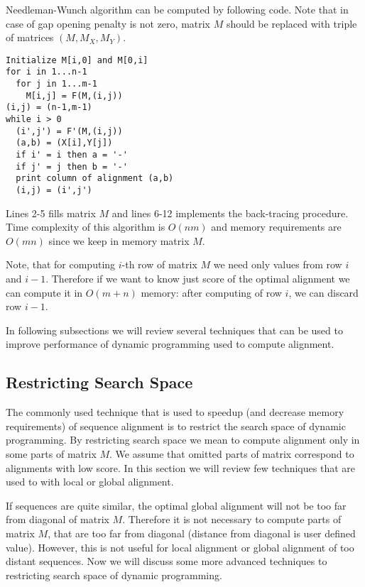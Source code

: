 Needleman-Wunch algorithm can be computed by following code. Note that in case
of gap opening penalty is not zero, matrix $M$ should be replaced with triple of
matrices $(M,M_X,M_Y)$. 

\lstset{showstringspaces=false}
\begin{lstlisting}
Initialize M[i,0] and M[0,i]
for i in 1...n-1
  for j in 1...m-1
    M[i,j] = F(M,(i,j))
(i,j) = (n-1,m-1)
while i > 0
  (i',j') = F'(M,(i,j))
  (a,b) = (X[i],Y[j])
  if i' = i then a = '-'
  if j' = j then b = '-'
  print column of alignment (a,b)
  (i,j) = (i',j')
\end{lstlisting}

Lines 2-5 fills matrix $M$ and lines 6-12 implements the back-tracing procedure.
Time complexity of this algorithm is $O(nm)$ and memory requirements are $O(mn)$
since we keep in memory matrix $M$.

Note, that for computing $i$-th row of matrix $M$ we need only values from row
$i$ and $i-1$. Therefore if we want to know just score of the optimal alignment
we can compute it in $O(m+n)$ memory: after computing of row $i$, we can discard
row $i-1$.

In following subsections we will review several techniques that can be used to
improve performance of dynamic programming used to compute alignment.

\subsection{Restricting Search Space}

The commonly used technique that is used to speedup (and decrease memory
requirements) of sequence alignment is to restrict the search space of dynamic
programming. By restricting search space we mean to compute alignment only in
some parts of matrix $M$. We assume that omitted parts of matrix correspond to
alignments with low score. In this section we will review few techniques that are
used to with local or global alignment.

If sequences are quite similar, the optimal global alignment will not be too far
from diagonal of matrix $M$. Therefore it is not necessary to compute parts of
matrix $M$, that are too far from diagonal (distance from diagonal is user
defined value). However, this is not useful for local alignment or global
alignment of too distant sequences. Now we will discuss some more advanced
techniques to restricting search space of dynamic programming.

